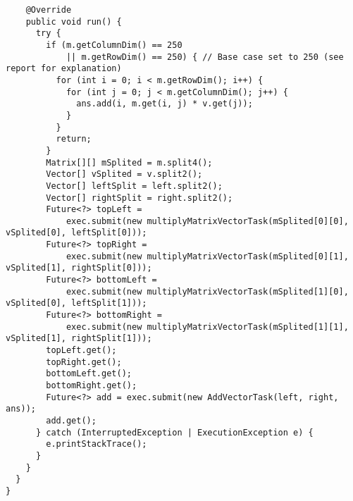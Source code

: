 \documentclass[11pt,letterpaper]{exam}
\begin{document}
\begin{lstlisting}
    @Override
    public void run() {
      try {
        if (m.getColumnDim() == 250
            || m.getRowDim() == 250) { // Base case set to 250 (see report for explanation)
          for (int i = 0; i < m.getRowDim(); i++) {
            for (int j = 0; j < m.getColumnDim(); j++) {
              ans.add(i, m.get(i, j) * v.get(j));
            }
          }
          return;
        }
        Matrix[][] mSplited = m.split4();
        Vector[] vSplited = v.split2();
        Vector[] leftSplit = left.split2();
        Vector[] rightSplit = right.split2();
        Future<?> topLeft =
            exec.submit(new multiplyMatrixVectorTask(mSplited[0][0], vSplited[0], leftSplit[0]));
        Future<?> topRight =
            exec.submit(new multiplyMatrixVectorTask(mSplited[0][1], vSplited[1], rightSplit[0]));
        Future<?> bottomLeft =
            exec.submit(new multiplyMatrixVectorTask(mSplited[1][0], vSplited[0], leftSplit[1]));
        Future<?> bottomRight =
            exec.submit(new multiplyMatrixVectorTask(mSplited[1][1], vSplited[1], rightSplit[1]));
        topLeft.get();
        topRight.get();
        bottomLeft.get();
        bottomRight.get();
        Future<?> add = exec.submit(new AddVectorTask(left, right, ans));
        add.get();
      } catch (InterruptedException | ExecutionException e) {
        e.printStackTrace();
      }
    }
  }
}
	\end{lstlisting}
\end{document}
